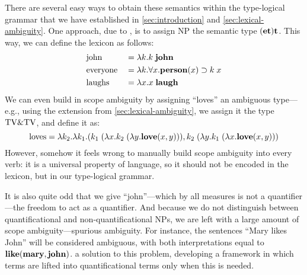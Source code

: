 There are several easy ways to obtain these semantics within the
type-logical grammar that we have established in
\autoref{sec:introduction} and \autoref{sec:lexical-ambiguity}.
One approach, due to \citet{montague1973}, is to assign NP the
semantic type $(\mathbf{e}\mathbf{t})\mathbf{t}$. This way, we can define the lexicon as
follows:
\begin{alignat*}{3}
  &\text{john}     &&= \lambda k. k\;\mathbf{john}                          \\
  &\text{everyone} &&= \lambda k. \forall x. \mathbf{person}(x)\supset k\;x \\
  &\text{laughs}   &&= \lambda x. x\;\mathbf{laugh}
\end{alignat*}
We can even build in scope ambiguity by assigning ``loves'' an
  ambiguous type---e.g., using the extension from
  \autoref{sec:lexical-ambiguity}, we assign it the type $\text{TV}\&\text{TV}$,
  and define it as:
\[
  \text{loves} = \lambda k_2. \lambda k_1.
  (k_1\;(\lambda x.k_2\;(\lambda y.\mathbf{love}(x,y))), k_2\;(\lambda y.k_1\;(\lambda x.\mathbf{love}(x,y)))
\]
However, somehow it feels wrong to manually build scope ambiguity into
every verb: it is a universal property of language, so it should not
be encoded in the lexicon, but in our type-logical grammar.

It is also quite odd that we give ``john''---which by all measures is
not a quantifier---the freedom to act as a quantifier. And because we
do not distinguish between quantificational and non-quantificational
NPs, we are left with a large amount of scope ambiguity---spurious
ambiguity. For instance, the sentences ``Mary likes John'' will be
considered ambiguous, with both interpretations equal to $\mathbf{like}(\mathbf{mary},
\mathbf{john})$. \citet{hendriks1993} a solution to this problem, developing a
framework in which terms are lifted into quantificational terms only
when this is needed.

\vspace*{1\baselineskip}


